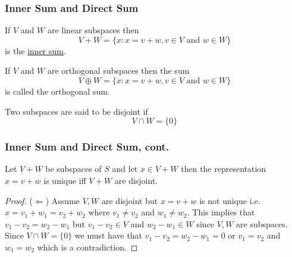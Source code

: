 \documentclass{beamer}
\begin{document}
\begin{frame}\frametitle{Inner Sum and Direct Sum}
\begin{definition} 
If $V$ and $W$ are linear subspaces then
\[ V + W = \{ x: x=v+w, v \in V \text{ and } w \in W\} \]
is the \underline{inner sum}.	
\end{definition}
\begin{definition}
 If $V$ and $W$ are orthogonal subspaces then the sum
\[ V \oplus W = \{ x: x = v + w, v \in V \text{ and } w \in W\} \]
is called the orthogonal sum.	
\end{definition}
\begin{definition}
Two subspaces are said to be disjoint if
\[ V \cap W = \{ 0 \} \]	
\end{definition}

\end{frame}

\begin{frame}\frametitle{Inner Sum and Direct Sum, cont.}
\begin{lemma}
  Let $V + W$ be subspaces of $S$ and let $x \in V + W$ then the
  representation $x = v + w$ is unique iff $V + W$ are disjoint.
\end{lemma}
\begin{proof}
	($\Leftarrow$) Assume $V,W$ are disjoint but $x = v+w$
is not unique i.e. $x = v_1+w_1 = v_2+w_2$ where $v_1 \neq v_2$ and
$w_1 \neq w_2$.  This implies that $v_1 - v_2 = w_2 - w_1$ but $v_1 -
v_2 \in V$ and $w_2 - w_1 \in W$ since $V,W$ are subspaces.  Since $V
\cap W = \{ 0 \}$ we must have that $v_1 - v_2 = w_2 - w_1 = 0$ or
$v_1 = v_2$ and $w_1 = w_2$ which is a contradiction.
\end{proof}

\end{frame}
\end{document}
